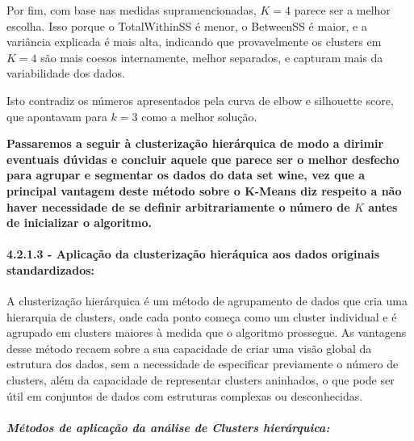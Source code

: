 \documentclass[
  letterpaper,
  DIV=11,
  numbers=noendperiod]{scrartcl}
\let\oldparagraph\paragraph
\renewcommand{\paragraph}[1]{\oldparagraph{#1}\mbox{}}
\let\oldsubparagraph\subparagraph
\renewcommand{\subparagraph}[1]{\oldsubparagraph{#1}\mbox{}}
\begin{document}
Por fim, com base nas medidas supramencionadas, \(K=4\) parece ser a
melhor escolha. Isso porque o TotalWithinSS é menor, o BetweenSS é
maior, e a variância explicada é mais alta, indicando que provavelmente
os clusters em \(K=4\) são mais coesos internamente, melhor separados, e
capturam mais da variabilidade dos dados.

Isto contradiz os números apresentados pela curva de elbow e silhouette
score, que apontavam para \(k=3\) como a melhor solução.

\textbf{Passaremos a seguir à clusterização hierárquica de modo a
dirimir eventuais dúvidas e concluir aquele que parece ser o melhor
desfecho para agrupar e segmentar os dados do data set wine, vez que a
principal vantagem deste método sobre o K-Means diz respeito a não haver
necessidade de se definir arbitrariamente o número de \(K\) antes de
inicializar o algoritmo.}

\paragraph{4.2.1.3 - Aplicação da clusterização hieráquica aos dados
originais
standardizados:}\label{aplicauxe7uxe3o-da-clusterizauxe7uxe3o-hieruxe1quica-aos-dados-originais-standardizados}

A clusterização hierárquica é um método de agrupamento de dados que cria
uma hierarquia de clusters, onde cada ponto começa como um cluster
individual e é agrupado em clusters maiores à medida que o algoritmo
prossegue. As vantagens desse método recaem sobre a sua capacidade de
criar uma visão global da estrutura dos dados, sem a necessidade de
especificar previamente o número de clusters, além da capacidade de
representar clusters aninhados, o que pode ser útil em conjuntos de
dados com estruturas complexas ou desconhecidas.

\newpage{}

\subparagraph{Métodos de aplicação da análise de Clusters
hierárquica:}\label{muxe9todos-de-aplicauxe7uxe3o-da-anuxe1lise-de-clusters-hieruxe1rquica}
\end{document}
